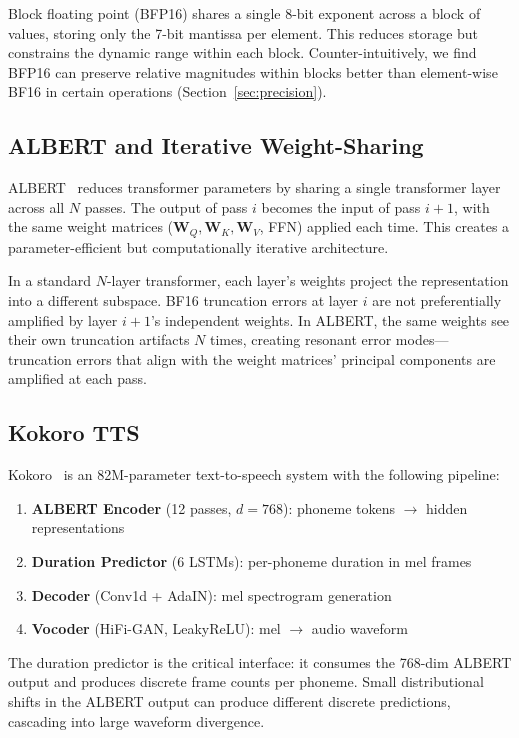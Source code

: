 \documentclass[11pt]{article}
\begin{document}
Block floating point (BFP16) shares a single 8-bit exponent across a block of values, storing only the 7-bit mantissa per element. This reduces storage but constrains the dynamic range within each block. Counter-intuitively, we find BFP16 can preserve relative magnitudes within blocks better than element-wise BF16 in certain operations (Section~\ref{sec:precision}).

\subsection{ALBERT and Iterative Weight-Sharing}

ALBERT~\citep{lan2020albert} reduces transformer parameters by sharing a single transformer layer across all $N$ passes. The output of pass $i$ becomes the input of pass $i{+}1$, with the same weight matrices ($\mathbf{W}_Q, \mathbf{W}_K, \mathbf{W}_V$, FFN) applied each time. This creates a parameter-efficient but computationally iterative architecture.

In a standard $N$-layer transformer, each layer's weights project the representation into a different subspace. BF16 truncation errors at layer $i$ are not preferentially amplified by layer $i{+}1$'s independent weights. In ALBERT, the same weights see their own truncation artifacts $N$ times, creating resonant error modes---truncation errors that align with the weight matrices' principal components are amplified at each pass.

\subsection{Kokoro TTS}

Kokoro~\citep{kokoro2024} is an 82M-parameter text-to-speech system with the following pipeline:
\begin{enumerate}[nosep]
    \item \textbf{ALBERT Encoder} (12 passes, $d=768$): phoneme tokens $\to$ hidden representations
    \item \textbf{Duration Predictor} (6 LSTMs): per-phoneme duration in mel frames
    \item \textbf{Decoder} (Conv1d + AdaIN): mel spectrogram generation
    \item \textbf{Vocoder} (HiFi-GAN, LeakyReLU): mel $\to$ audio waveform
\end{enumerate}
The duration predictor is the critical interface: it consumes the 768-dim ALBERT output and produces discrete frame counts per phoneme. Small distributional shifts in the ALBERT output can produce different discrete predictions, cascading into large waveform divergence.
\end{document}
